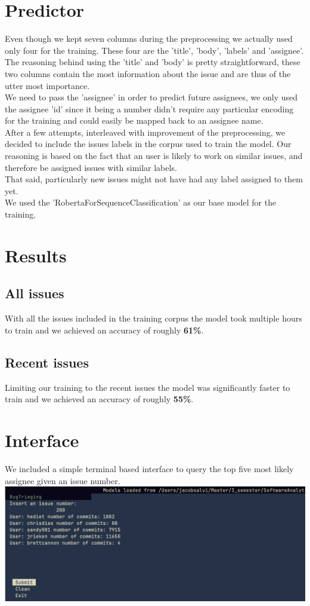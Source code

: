 \documentclass[tikz,10pt,fleqn]{article}
\begin{document}
\section*{Predictor}
Even though we kept seven columns during the preprocessing we actually used only four for the training. These four are the 'title', 'body', 'labels' and 'assignee'.\\
The reasoning behind using the 'title' and 'body' is pretty straightforward, these two columns contain the most information about the issue and are thus of the utter most importance. \\
We need to pass the 'assignee' in order to predict future assignees, we only used the assignee 'id' since it being a number didn't require any particular encoding for the training and could easily be mapped back to an assignee name.\\
After a few attempts, interleaved with improvement of the preprocessing, we decided to include the issues labels in the corpus used to train the model. Our reasoning is based on the fact that an user is likely to work on similar issues, and therefore be assigned issues with similar labels.\\
That said, particularly new issues might not have had any label assigned to them yet.\\
We used the 'RobertaForSequenceClassification' as our base model for the training.


\section*{Results}
\subsection*{All issues}
With all the issues included in the training corpus the model took multiple hours to train and we achieved an accuracy of roughly \textbf{61\%}.

\subsection*{Recent issues}
Limiting our training to the recent issues the model was significantly faster to train and we achieved an accuracy of roughly \textbf{55\%}.

\section*{Interface}
We included a simple terminal based interface to query the top five most likely assignee given an issue number.\\
\includegraphics[width=\textwidth]{./tui.png}
\end{document}
